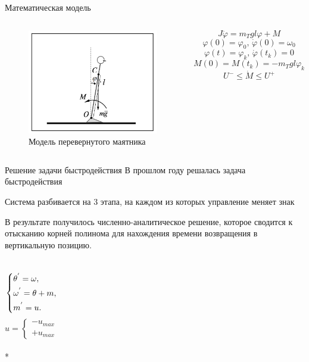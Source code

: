 \documentclass[10pt]{beamer}
\begin{document}
\begin{frame}{Математическая модель}
	\begin{columns}
		\begin{figure}[h!]
			\includegraphics[width=1\linewidth]{images/inverse_pendulum.png}
			\caption{Модель перевернутого маятника}
		\end{figure}

		\[
			J\ddot{\varphi}=m_Tgl\varphi+M
		\]
		\[
			\varphi(0)=\varphi_0,\, \dot{\varphi}(0)=\omega_0
		\]
		\[
			\varphi(t)=\varphi_k,\, \dot{\varphi}(t_k)=0
		\]
		\[
			M(0)=M(t_k)=-m_Tgl\varphi_k
		\]
		\[
			U^-\leq\dot{M}\leq U^+
		\]
	\end{columns}
\end{frame}
\begin{frame}{Решение задачи быстродействия}
	В прошлом году решалась задача быстродействия

	Система разбивается на 3 этапа, на каждом из которых управление меняет знак

	В результате получилось численно-аналитическое решение, которое сводится к отысканию корней полинома для нахождения времени возвращения в вертикальную позицию.
	\begin{columns}
		\column{0.5\textwidth}
		\begin{equation}\label{koshisystem}
			\left\{ {\begin{aligned}
						 & \theta^{'} = \omega , \hfill   \\
						 & \omega^{'} = \theta+m , \hfill \\
						 & m^{'} = u . \hfill             \\
					\end{aligned}} \right.
		\end{equation}
		\column{0.5\textwidth}
		\[
			u=
			\begin{cases}
				-u_{max} \\
				+u_{max}
			\end{cases}
		\]\\*
	\end{columns}

\end{frame}
\end{document}
